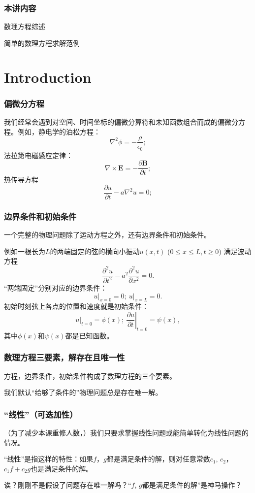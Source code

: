 \documentclass[CJK]{beamer}
\date{}
\begin{document}
  \bch
{}

\begin{frame}
  \frametitle{本讲内容}  
  \bitem
\item{数理方程综述}
\item{简单的数理方程求解范例}
  \eitem
\end{frame}

\section{Introduction}


\begin{frame}
  \frametitle{偏微分方程}
  我们经常会遇到对空间、时间坐标的偏微分算符和未知函数组合而成的偏微分方程。例如，静电学的泊松方程：
  $$ \nabla^2\phi = -\frac{\rho}{\epsilon_0};$$
  法拉第电磁感应定律：
  $$ \nabla\times \mathbf{E} = -\frac{\partial \mathbf{B}}{\partial t};$$
  热传导方程
  $$\frac{\partial u}{\partial t} - a\nabla^2 u = 0;$$
\end{frame}


\begin{frame}
  \frametitle{边界条件和初始条件}
  一个完整的物理问题除了运动方程之外，还有边界条件和初始条件。

  例如一根长为$L$的两端固定的弦的横向小振动$u(x, t)$ ($0\le x\le L, t\ge 0$) 满足波动方程
  $$\frac{\partial^2u}{\partial t^2} - a^2\frac{\partial^2u}{\partial x^2} = 0 .$$
  “两端固定”分别对应的边界条件：
  $$ \left.u\right\vert_{x=0} = 0;\ \left.u\right\vert_{x=L} = 0.$$
  初始时刻弦上各点的位置和速度就是初始条件：
  $$ \left.u\right\vert_{t=0} = \phi(x);\ \left.\frac{\partial u}{\partial t}\right\vert_{t=0} = \psi(x),$$
  其中$\phi(x)$和$\psi(x)$都是已知函数。
\end{frame}

\begin{frame}
  \frametitle{数理方程三要素，解存在且唯一性}
  
  {\blue 方程，边界条件，初始条件构成了数理方程的三个要素。}

  \skipline

  我们默认“给够了条件的”物理问题总是存在唯一解。
\end{frame}


\begin{frame}
  \frametitle{“线性”（可迭加性）}
  （为了减少本课重修人数，）{\blue 我们只要求掌握线性问题或能简单转化为线性问题的情况。}

  “线性”是指这样的特性：如果$f$，$g$都是满足条件的解，则对任意常数$c_1$, $c_2$，$c_1f+c_2g$也是满足条件的解。


  诶？刚刚不是假设了问题存在唯一解吗？“$f$, $g$都是满足条件的解”是神马操作？
  
\end{frame}
\end{document}
